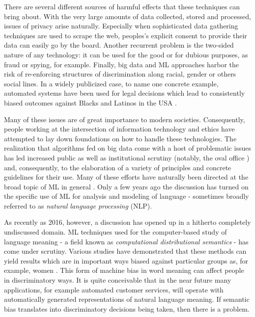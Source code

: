 \documentclass{article}
\begin{document}
There are several different sources of harmful effects that these techniques can bring about. With the very large amounts of data collected, stored and processed, issues of privacy arise naturally. Especially when sophisticated data gathering techniques are used to scrape the web, peoples's explicit consent to provide their data can easily go by the board. Another recurrent problem is the two-sided nature of any technology: it can be used for the good or for dubious purposes, as fraud or spying, for example. Finally, big data and ML approaches harbor the risk of re-enforcing structures of discrimination along racial, gender or others social lines. In a widely publicized case, to name one concrete example, automated systems have been used for legal decisions which lead to consistently biased outcomes against Blacks and Latinos in the USA \cite{angwin2016machine}.

Many of these issues are of great importance to modern societies. Consequently, people working at the intersection of information technology and ethics have attempted to lay down foundations on how to handle these technologies. The realization that algorithms fed on big data come with a host of problematic issues has led increased public as well as institutional scrutiny (notably, the oval office \cite{united2014big}) and, consequently, to the elaboration of a variety of principles and concrete guidelines for their use. Many of these efforts have naturally been directed at the broad topic of ML in general \cite{leidner2017ethical}. Only a few years ago the discussion has turned on the specific use of ML for analysis and modeling of language - sometimes broadly referred to as \emph{natural language processing} (NLP).

As recently as 2016, however, a discussion has opened up in a hitherto completely undiscussed domain. ML techniques used for the computer-based study of language meaning - a field known as \emph{computational distributional semantics} - has come under scrutiny.
Various studies have demonstrated that these methods can  yield results which are in important ways biased against particular groups as, for example, women \cite{bolukbasi2016man}\cite{wagner2015s}.
This form of machine bias in word meaning can affect people in discriminatory ways. It is quite conceivable that in the near future many applications, for example automated customer services, will operate with automatically generated representations of natural language meaning. If semantic bias translates into discriminatory decisions being taken, then there is a problem.
\end{document}
